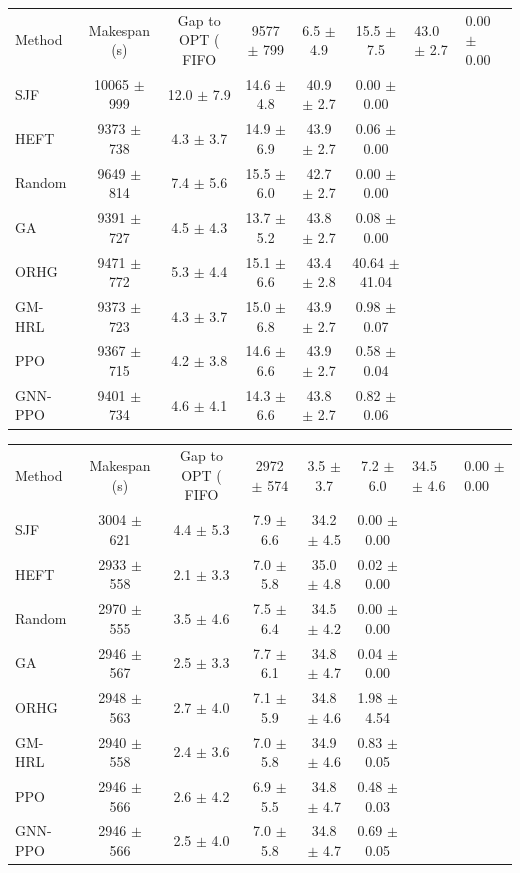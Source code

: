 \begin{tabular}{lccccc}
\toprule
Method & Makespan (s) & Gap to OPT (%
\midrule
FIFO & 9577 $\pm$ 799 & 6.5 $\pm$ 4.9 & 15.5 $\pm$ 7.5 & 43.0 $\pm$ 2.7 & 0.00 $\pm$ 0.00 \\
SJF & 10065 $\pm$ 999 & 12.0 $\pm$ 7.9 & 14.6 $\pm$ 4.8 & 40.9 $\pm$ 2.7 & 0.00 $\pm$ 0.00 \\
HEFT & 9373 $\pm$ 738 & 4.3 $\pm$ 3.7 & 14.9 $\pm$ 6.9 & 43.9 $\pm$ 2.7 & 0.06 $\pm$ 0.00 \\
Random & 9649 $\pm$ 814 & 7.4 $\pm$ 5.6 & 15.5 $\pm$ 6.0 & 42.7 $\pm$ 2.7 & 0.00 $\pm$ 0.00 \\
GA & 9391 $\pm$ 727 & 4.5 $\pm$ 4.3 & 13.7 $\pm$ 5.2 & 43.8 $\pm$ 2.7 & 0.08 $\pm$ 0.00 \\
ORHG & 9471 $\pm$ 772 & 5.3 $\pm$ 4.4 & 15.1 $\pm$ 6.6 & 43.4 $\pm$ 2.8 & 40.64 $\pm$ 41.04 \\
GM-HRL & 9373 $\pm$ 723 & 4.3 $\pm$ 3.7 & 15.0 $\pm$ 6.8 & 43.9 $\pm$ 2.7 & 0.98 $\pm$ 0.07 \\
PPO & 9367 $\pm$ 715 & 4.2 $\pm$ 3.8 & 14.6 $\pm$ 6.6 & 43.9 $\pm$ 2.7 & 0.58 $\pm$ 0.04 \\
GNN-PPO & 9401 $\pm$ 734 & 4.6 $\pm$ 4.1 & 14.3 $\pm$ 6.6 & 43.8 $\pm$ 2.7 & 0.82 $\pm$ 0.06 \\
\bottomrule
\end{tabular}

\begin{tabular}{lccccc}
\toprule
Method & Makespan (s) & Gap to OPT (%
\midrule
FIFO & 2972 $\pm$ 574 & 3.5 $\pm$ 3.7 & 7.2 $\pm$ 6.0 & 34.5 $\pm$ 4.6 & 0.00 $\pm$ 0.00 \\
SJF & 3004 $\pm$ 621 & 4.4 $\pm$ 5.3 & 7.9 $\pm$ 6.6 & 34.2 $\pm$ 4.5 & 0.00 $\pm$ 0.00 \\
HEFT & 2933 $\pm$ 558 & 2.1 $\pm$ 3.3 & 7.0 $\pm$ 5.8 & 35.0 $\pm$ 4.8 & 0.02 $\pm$ 0.00 \\
Random & 2970 $\pm$ 555 & 3.5 $\pm$ 4.6 & 7.5 $\pm$ 6.4 & 34.5 $\pm$ 4.2 & 0.00 $\pm$ 0.00 \\
GA & 2946 $\pm$ 567 & 2.5 $\pm$ 3.3 & 7.7 $\pm$ 6.1 & 34.8 $\pm$ 4.7 & 0.04 $\pm$ 0.00 \\
ORHG & 2948 $\pm$ 563 & 2.7 $\pm$ 4.0 & 7.1 $\pm$ 5.9 & 34.8 $\pm$ 4.6 & 1.98 $\pm$ 4.54 \\
GM-HRL & 2940 $\pm$ 558 & 2.4 $\pm$ 3.6 & 7.0 $\pm$ 5.8 & 34.9 $\pm$ 4.6 & 0.83 $\pm$ 0.05 \\
PPO & 2946 $\pm$ 566 & 2.6 $\pm$ 4.2 & 6.9 $\pm$ 5.5 & 34.8 $\pm$ 4.7 & 0.48 $\pm$ 0.03 \\
GNN-PPO & 2946 $\pm$ 566 & 2.5 $\pm$ 4.0 & 7.0 $\pm$ 5.8 & 34.8 $\pm$ 4.7 & 0.69 $\pm$ 0.05 \\
\bottomrule
\end{tabular}

